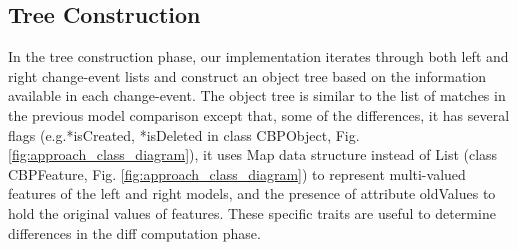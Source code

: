 \documentclass{llncs}
\begin{document}
\subsection{Tree Construction}
\label{sec:tree_construction}
In the tree construction phase, our implementation iterates through both left and right change-event lists and construct an object tree based on the information available in each change-event. The object tree is similar to the list of matches in the previous model comparison except that, some of the differences, it has several flags (e.g.\textsf{*isCreated}, \textsf{*isDeleted} in class \textsf{CBPObject}, Fig. \ref{fig:approach_class_diagram}), it uses Map data structure instead of List (class \textsf{CBPFeature}, Fig. \ref{fig:approach_class_diagram}) to represent multi-valued features of the left and right models, and the presence of attribute \textsf{oldValues} to hold the original values of features. These specific traits are useful to determine differences in the diff computation phase.
\end{document}
